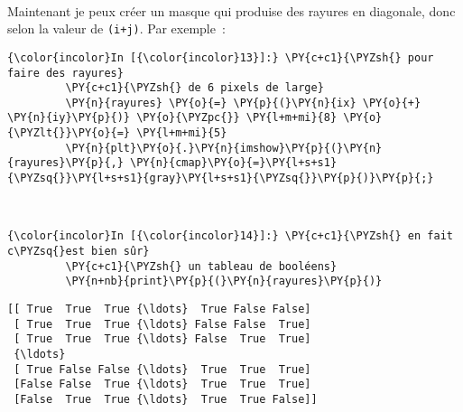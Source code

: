     \begin{center}
    \end{center}
    { \hspace*{\fill} \\}
    
    Maintenant je peux créer un masque qui produise des rayures en
diagonale, donc selon la valeur de \texttt{(i+j)}. Par exemple~:

    \begin{Verbatim}[commandchars=\\\{\},frame=single,framerule=0.3mm,rulecolor=\color{cellframecolor}]
{\color{incolor}In [{\color{incolor}13}]:} \PY{c+c1}{\PYZsh{} pour faire des rayures}
         \PY{c+c1}{\PYZsh{} de 6 pixels de large}
         \PY{n}{rayures} \PY{o}{=} \PY{p}{(}\PY{n}{ix} \PY{o}{+} \PY{n}{iy}\PY{p}{)} \PY{o}{\PYZpc{}} \PY{l+m+mi}{8} \PY{o}{\PYZlt{}}\PY{o}{=} \PY{l+m+mi}{5}
         \PY{n}{plt}\PY{o}{.}\PY{n}{imshow}\PY{p}{(}\PY{n}{rayures}\PY{p}{,} \PY{n}{cmap}\PY{o}{=}\PY{l+s+s1}{\PYZsq{}}\PY{l+s+s1}{gray}\PY{l+s+s1}{\PYZsq{}}\PY{p}{)}\PY{p}{;}
\end{Verbatim}


    \begin{center}
    \end{center}
    { \hspace*{\fill} \\}
    
    \begin{Verbatim}[commandchars=\\\{\},frame=single,framerule=0.3mm,rulecolor=\color{cellframecolor}]
{\color{incolor}In [{\color{incolor}14}]:} \PY{c+c1}{\PYZsh{} en fait c\PYZsq{}est bien sûr}
         \PY{c+c1}{\PYZsh{} un tableau de booléens}
         \PY{n+nb}{print}\PY{p}{(}\PY{n}{rayures}\PY{p}{)}
\end{Verbatim}


    \begin{Verbatim}[commandchars=\\\{\},frame=single,framerule=0.3mm,rulecolor=\color{cellframecolor}]
[[ True  True  True {\ldots}  True False False]
 [ True  True  True {\ldots} False False  True]
 [ True  True  True {\ldots} False  True  True]
 {\ldots}
 [ True False False {\ldots}  True  True  True]
 [False False  True {\ldots}  True  True  True]
 [False  True  True {\ldots}  True  True False]]
\end{Verbatim}

